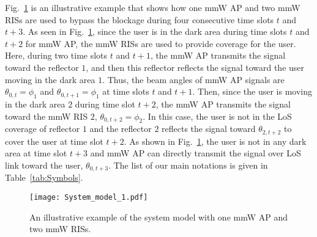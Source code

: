 \documentclass[conference]{IEEEtran}
\begin{document}
Fig.~\ref{System_model_1} is an illustrative example that shows how one mmW AP and two mmW RISs are used to bypass the blockage during four consecutive time slots $t$ and $t+3$. As seen in Fig.~\ref{System_model_1}, since the user is in the dark area during time slots $t$ and $t+2$ for mmW AP, the mmW RISs are used to provide coverage for the user. Here, during two time slots $t$ and $t+1$, the mmW AP transmits the signal toward the reflector $1$, and then this reflector reflects the signal toward the user moving in the dark area $1$. Thus, the beam angles of mmW AP signals are $\theta_{0,t}=\phi_1$ and $\theta_{0,t+1}=\phi_{1}$ at time slots $t$ and $t+1$. Then, since the user is moving in the dark area $2$ during time slot $t+2$, the mmW AP transmits the signal toward the mmW RIS $2$, $\theta_{0,t+2}=\phi_2$. In this case, the user is not in the LoS coverage of reflector $1$ and the reflector $2$ reflects the signal toward $\theta_{2,t+2}$ to cover the user at time slot $t+2$. As shown in Fig.~\ref{System_model_1}, the user is not in any dark area at time slot $t+3$ and mmW AP can directly transmit the signal over LoS link toward the user, $\theta_{0,t+3}$. The list of our main notations is given in Table~\ref{tab:Symbols}.
\begin{figure}[!t]
	\begin{center}
		\texttt{[image: System\_model\_1.pdf]}		\vspace{-0.1cm}
		\caption{ \small An illustrative example of the system model with one mmW AP and two mmW RISs.}
        \vspace{-0.4cm}
		\label{System_model_1}
	\end{center}
\end{figure}
\end{document}
